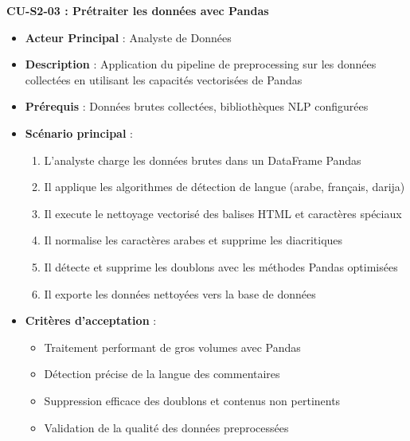 \textbf{CU-S2-03 : Prétraiter les données avec Pandas}
\begin{itemize}
    \item \textbf{Acteur Principal} : Analyste de Données
    \item \textbf{Description} : Application du pipeline de preprocessing sur les données collectées en utilisant les capacités vectorisées de Pandas
    \item \textbf{Prérequis} : Données brutes collectées, bibliothèques NLP configurées
    \item \textbf{Scénario principal} :
    \begin{enumerate}
        \item L'analyste charge les données brutes dans un DataFrame Pandas
        \item Il applique les algorithmes de détection de langue (arabe, français, darija)
        \item Il execute le nettoyage vectorisé des balises HTML et caractères spéciaux
        \item Il normalise les caractères arabes et supprime les diacritiques
        \item Il détecte et supprime les doublons avec les méthodes Pandas optimisées
        \item Il exporte les données nettoyées vers la base de données
    \end{enumerate}
    \item \textbf{Critères d'acceptation} :
    \begin{itemize}
        \item Traitement performant de gros volumes avec Pandas
        \item Détection précise de la langue des commentaires
        \item Suppression efficace des doublons et contenus non pertinents
        \item Validation de la qualité des données preprocessées
    \end{itemize}
\end{itemize}

